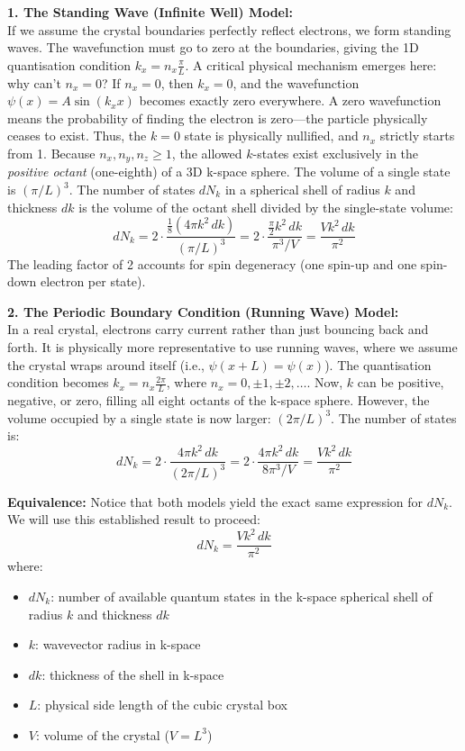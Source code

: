 \textbf{1. The Standing Wave (Infinite Well) Model:} \\
If we assume the crystal boundaries perfectly reflect electrons, we form standing waves. The wavefunction must go to zero at the boundaries, giving the 1D quantisation condition $k_x = n_x \frac{\pi}{L}$. A critical physical mechanism emerges here: why can't $n_x = 0$? If $n_x = 0$, then $k_x = 0$, and the wavefunction $\psi(x) = A \sin(k_x x)$ becomes exactly zero everywhere. A zero wavefunction means the probability of finding the electron is zero—the particle physically ceases to exist. Thus, the $k=0$ state is physically nullified, and $n_x$ strictly starts from 1.
Because $n_x, n_y, n_z \ge 1$, the allowed $k$-states exist exclusively in the \emph{positive octant} (one-eighth) of a 3D k-space sphere. The volume of a single state is $(\pi/L)^3$. The number of states $dN_k$ in a spherical shell of radius $k$ and thickness $dk$ is the volume of the octant shell divided by the single-state volume:
\begin{equation*}
    dN_k = 2 \cdot \frac{\frac{1}{8}(4\pi k^2\,dk)}{(\pi/L)^3} = 2 \cdot \frac{\frac{\pi}{2} k^2\,dk}{\pi^3/V} = \frac{V k^2\,dk}{\pi^2}
\end{equation*}
The leading factor of 2 accounts for spin degeneracy (one spin-up and one spin-down electron per state).

\textbf{2. The Periodic Boundary Condition (Running Wave) Model:} \\
In a real crystal, electrons carry current rather than just bouncing back and forth. It is physically more representative to use running waves, where we assume the crystal wraps around itself (i.e., $\psi(x+L) = \psi(x)$). The quantisation condition becomes $k_x = n_x \frac{2\pi}{L}$, where $n_x = 0, \pm 1, \pm 2, \dots$.
Now, $k$ can be positive, negative, or zero, filling all eight octants of the k-space sphere. However, the volume occupied by a single state is now larger: $(2\pi/L)^3$. The number of states is:
\begin{equation*}
    dN_k = 2 \cdot \frac{4\pi k^2\,dk}{(2\pi/L)^3} = 2 \cdot \frac{4\pi k^2\,dk}{8\pi^3/V} = \frac{V k^2\,dk}{\pi^2}
\end{equation*}

\textbf{Equivalence:} Notice that both models yield the exact same expression for $dN_k$. We will use this established result to proceed:
\begin{equation*}
    dN_k = \frac{V k^2\,dk}{\pi^2}
\end{equation*}
where:
\begin{itemize}
    \item $dN_k$: number of available quantum states in the k-space spherical shell of radius $k$ and thickness $dk$
    \item $k$: wavevector radius in k-space
    \item $dk$: thickness of the shell in k-space
    \item $L$: physical side length of the cubic crystal box
    \item $V$: volume of the crystal ($V = L^3$)
\end{itemize}

